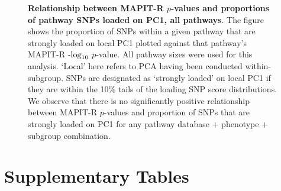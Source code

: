 \documentclass[12pt,a4paper]{article}
\def\log{{\rm log}}
\begin{document}
\addtocounter{figure}{-1}
\begin{figure} [t!]
  \caption{\textbf{Relationship between MAPIT-R $p$-values and proportions of pathway SNPs loaded on PC1, all pathways}. The figure shows the proportion of SNPs within a given pathway that are strongly loaded on local PC1 plotted against that pathway's MAPIT-R -$\log_{10}$ $p$-value. All pathway sizes were used for this analysis. `Local' here refers to PCA having been conducted within-subgroup. SNPs are designated as `strongly loaded' on local PC1 if they are within the 10\% tails of the loading SNP score distributions. We observe that there is no significantly positive relationship between MAPIT-R $p$-values and proportion of SNPs that are strongly loaded on PC1 for any pathway database + phenotype + subgroup combination.}
\label{InterPath-Supp-Figure-PC1Loading-AllPaths-Caption}
\end{figure}
\clearpage





\section{Supplementary Tables}\label{Supplementary-Tables}
\end{document}
